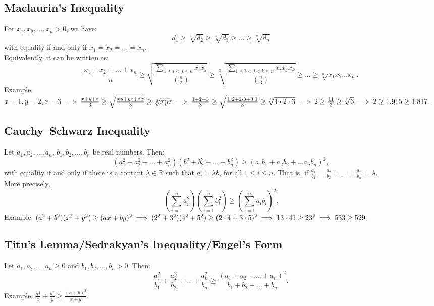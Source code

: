 \documentclass[a4paper,11pt]{article}
\begin{document}
\subsection{Maclaurin's Inequality}
\begin{tcolorbox}
    For $x_1, x_2, \dots, x_n > 0$, we have:
    \[
    d_1 \geq \sqrt[2]{d_2} \geq \sqrt[3]{d_3} \geq \dots \geq \sqrt[n]{d_n}
    \]
    with equality if and only if $x_1 = x_2 = \dots = x_n$. \\[6pt]
    Equivalently, it can be written as:
    \[
    \frac{x_1+x_2+\dots+x_n}{n} \geq \sqrt{\frac{\sum_{1\leq i<j\leq n} x_ix_j}{\binom{n}{2}}} \geq \sqrt[3]{\frac{\sum_{1\leq i<j<k\leq n} x_ix_jx_k}{\binom{n}{3}}} \geq \dots \geq \sqrt[n]{x_1x_2\dots x_n}.
    \]
    Example: $\textstyle x=1, y=2, z=3 \implies \frac{x+y+z}{3} \geq \sqrt{\frac{xy + yz + zx}{3}} \geq \sqrt[3]{xyz} \\[6pt]
    \implies \frac{1+2+3}{3} \geq \sqrt{\frac{1\cdot2 + 2\cdot3 + 3\cdot1}{3}} \geq \sqrt[3]{1\cdot2\cdot3} \implies 2 \geq \frac{11}{3} \geq \sqrt[3]{6} \implies 2 \geq 1.915 \geq 1.817$.
\end{tcolorbox}


\subsection{Cauchy–Schwarz Inequality}
\begin{tcolorbox}
    Let $a_1, a_2, \dots, a_n$, $b_1, b_2, \dots, b_n$ be real numbers. Then:
    \[
    (a_1^2 + a_2^2 + \dots + a_n^2)(b_1^2 + b_2^2 + \dots + b_n^2) \geq (a_1b_1 + a_2b_2 + \dots a_nb_n)^2,
    \]
    with equality if and only if there is a contant $\lambda \in \mathbb{R}$ such that $a_i = \lambda b_i$ for all $1 \leq i \leq n$. That is, if $\textstyle \frac{a_1}{b_1} = \frac{a_2}{b_2} = \dots = \frac{a_n}{b_n} = \lambda$. \\[6pt]
    More precisely,
    \[
    \left(\sum_{i=1}^n a_i^2\right)\left(\sum_{i=1}^n b_i^2\right) \geq \left(\sum_{i=1}^n a_ib_i\right)^2.
    \]
    Example: $\textstyle (a^2+b^2)(x^2+y^2) \geq (ax+by)^2 \implies (2^2 + 3^2)(4^2 + 5^2) \geq (2\cdot4+3\cdot5)^2 \\[6pt]
    \implies 13\cdot41\geq23^2 \implies 533\geq529$.
\end{tcolorbox}


\subsection{Titu's Lemma/Sedrakyan's Inequality/Engel's Form}
\begin{tcolorbox}
    Let $a_1,a_2,\dots,a_n\geq0$ and $b_1,b_2,\dots,b_n>0$. Then:
    \[
    \frac{a_1^2}{b_1} + \frac{a_2^2}{b_2} + \dots + \frac{a_n^2}{b_n} \geq \frac{(a_1+a_2+\dots+a_n)^2}{b_1+b_2+\dots+b_n}.
    \]
    Example: $\textstyle \frac{a^2}{x} + \frac{b^2}{y} \geq \frac{(a+b)^2}{x+y}$.
\end{tcolorbox}
\end{document}
